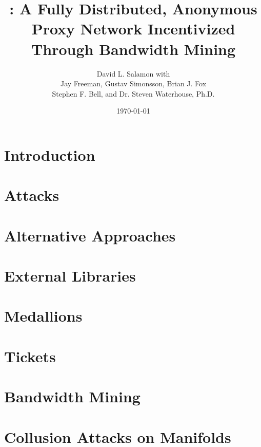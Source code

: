 \documentclass{article}
\title{\Orchid: A Fully Distributed, Anonymous Proxy Network Incentivized Through Bandwidth Mining}
\author{{David L. Salamon with} \\ {Jay Freeman, Gustav Simonsson, Brian J. Fox} \\ {{Stephen F. Bell, and Dr. Steven Waterhouse, Ph.D.}}}
\date{\today{}}
\begin{document}
\maketitle

\begin{abstract}

\end{abstract}


\newpage
\tableofcontents
\newpage

\section{Introduction}
\label{sec:overview}


\section{Attacks}
\label{sec:attacks}


\section{Alternative Approaches}
\label{sec:prior-work}


\section{External Libraries}
\label{sec:external-libraries}


\section{Medallions}
\label{medallions}


\section{Tickets}
\label{sec:tickets}


\section{Bandwidth Mining}
\label{sec:mining}


\section{Collusion Attacks on Manifolds}
\label{sec:collusion-attacks}

\end{document}
